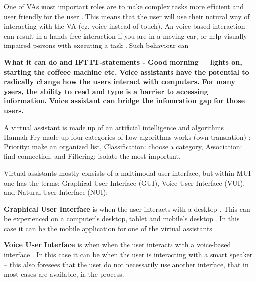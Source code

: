 \documentclass[fleqn,10pt]{wlscirep}
\begin{document}
One of VAs most important roles are to make complex tasks more efficient and user friendly for the user \cite{Corbett.E}. This means that the user will use their natural way of interacting with the VA (eg. voice instead of touch)\cite{Neto.AT}. An voice-based interaction can result in a hands-free interaction if you are in a moving  car, or help visually impaired persons with executing a task \cite{pyae.a} 
. Such behaviour can %

\textbf{ What it can do and IFTTT-statements - Good morning = lights on, starting the coffeee machine etc.} 
\textbf{Voice assistants have the potential to radically change how the users interact with computers. For many ysers, the ability to read and type is a barrier to accessing information. Voice assistant can bridge the infomration gap for those users.}
\cite{Hoy.M}

A virtual assistant is made up of an artificial intelligence and algorithms \cite{Fry.H}. Hannah Fry \cite{Fry.H} made up four categories of how algorithms works (own translation) : Priority: make an organized list, Classification: choose a category, Association: find connection, and Filtering: isolate the most important. 


Virtual assistants mostly consists of a multimodal user interface, but within MUI one has the terms; Graphical User Interface (GUI), Voice User Interface (VUI), and  Natural User Interface (NUI);

\textbf{Graphical User Interface} is when the user interacts with a desktop \cite{Interaction-Design-Foundation-GUI}. This can be experienced on a computer's desktop, tablet and mobile's desktop \cite{Interaction-Design-Foundation-GUI}. In this case it can be the mobile application for one of the virtual assistants. 
 
\textbf{Voice User Interface} is when when the user interacts with a voice-based interface \cite{Interaction-Design-Foundation-VUI}. In this case it can be when the user is interacting with a smart speaker – this also foresees that the user do not necessarily use another interface, that in most cases are available, in the process.  
 
\end{document}
